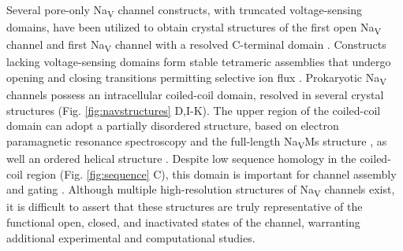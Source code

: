 \begin{refsection}
Several pore-only Na\textsubscript{V} channel constructs, with truncated voltage-sensing domains, have been utilized to obtain crystal structures of the first open Na\textsubscript{V} channel and first Na\textsubscript{V} channel with a resolved C-terminal domain \cite{Shaya:2014gg,McCusker:2012di}. Constructs lacking voltage-sensing domains form stable tetrameric assemblies that undergo opening and closing transitions permitting selective ion flux \cite{Shaya:2011ih,McCusker:2011tn}. Prokaryotic Na\textsubscript{V} channels possess an intracellular coiled-coil domain, resolved in several crystal structures (Fig. \ref{fig:navstructures} D,I-K). The upper region of the coiled-coil domain can adopt a partially disordered structure, based on electron paramagnetic resonance spectroscopy and the full-length Na\textsubscript{V}Ms structure \cite{Bagneris:2013bu,Sula:2017hu}, as well an ordered helical structure \cite{Lenaeus:2017cy,Tang:2014cn,Arrigoni:2016fs,Shaya:2014gg}. Despite low sequence homology in the coiled-coil region (Fig. \ref{fig:sequence} C), this domain is important for channel assembly and gating \cite{Mio:2010cb,Bagneris:2013bu,Powl:2010ke,Irie:2012dn,Tsai:2013ie,Shaya:2014gg,Arrigoni:2016fs}. Although multiple high-resolution structures of Na\textsubscript{V} channels exist, it is difficult to assert that these structures are truly representative of the functional open, closed, and inactivated states of the channel, warranting additional experimental and computational studies.



\end{refsection}
